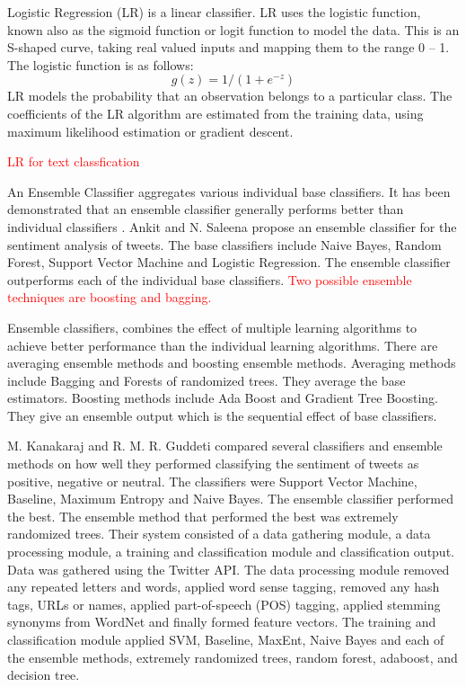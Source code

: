 Logistic Regression (LR) is a linear classifier. LR uses the logistic function, known also as the sigmoid function or logit function to model the data. This is an S-shaped curve, taking real valued inputs and mapping them to the range 0 – 1. The logistic function is as follows: \[g(z)=1/(1+e^{-z})\]
LR models the probability that an observation belongs to a particular class. The coefficients of the LR algorithm are estimated from the training data, using maximum likelihood estimation or gradient descent.

\textcolor{red}{LR for text classfication}

An Ensemble Classifier aggregates various individual base classifiers. It has been demonstrated that an ensemble classifier generally performs better than individual classifiers \cite{Opitz1999}. Ankit and N. Saleena \cite{Ankit2018} propose an ensemble classifier for the sentiment analysis of tweets. The base classifiers include Naive Bayes, Random Forest, Support Vector Machine and Logistic Regression. The ensemble classifier outperforms each of the individual base classifiers.
\textcolor{red}{Two possible ensemble techniques are boosting and bagging.}

Ensemble classifiers, combines the effect of multiple learning algorithms to achieve better performance than the individual learning algorithms. There are averaging ensemble methods and boosting ensemble methods. Averaging methods include Bagging and Forests of randomized trees. They average the base estimators. Boosting methods include Ada Boost and Gradient Tree Boosting. They give an ensemble output which is the sequential effect of base classifiers. 

M. Kanakaraj and R. M. R. Guddeti \cite{Kanakaraj2015} compared several classifiers and ensemble methods on how well they performed classifying the sentiment of tweets as positive, negative or neutral. The classifiers were Support Vector Machine, Baseline, Maximum Entropy and Naive Bayes. The ensemble classifier performed the best. The ensemble method that performed the best was extremely randomized trees. Their system consisted of a data gathering module, a data processing module, a training and classification module and classification output. Data was gathered using the Twitter API. The data processing module removed any repeated letters and words, applied word sense tagging, removed any hash tags, URLs or names, applied part-of-speech (POS) tagging, applied stemming synonyms from WordNet and finally formed feature vectors. The training and classification module applied SVM, Baseline, MaxEnt, Naive Bayes and each of the ensemble methods, extremely randomized trees, random forest, adaboost, and decision tree.

